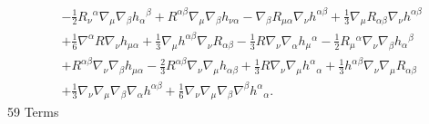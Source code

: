 \documentclass[10pt,letterpaper]{article}
\begin{document}
\begin{align}
& -  \tfrac{1}{2} R_{\nu}{}^{\alpha} \nabla_{\mu}\nabla_{\beta}h_{\alpha}{}^{\beta}
 + R^{\alpha \beta} \nabla_{\mu}\nabla_{\beta}h_{\nu \alpha}
 -  \nabla_{\beta}R_{\mu \alpha} \nabla_{\nu}h^{\alpha \beta}
 + \tfrac{1}{3} \nabla_{\mu}R_{\alpha \beta} \nabla_{\nu}h^{\alpha \beta}\nonumber\\
& + \tfrac{1}{6} \nabla^{\alpha}R \nabla_{\nu}h_{\mu \alpha}
 + \tfrac{1}{3} \nabla_{\mu}h^{\alpha \beta} \nabla_{\nu}R_{\alpha \beta}
 -  \tfrac{1}{3} R \nabla_{\nu}\nabla_{\alpha}h_{\mu}{}^{\alpha}
 -  \tfrac{1}{2} R_{\mu}{}^{\alpha} \nabla_{\nu}\nabla_{\beta}h_{\alpha}{}^{\beta}\nonumber\\
& + R^{\alpha \beta} \nabla_{\nu}\nabla_{\beta}h_{\mu \alpha}
 -  \tfrac{2}{3} R^{\alpha \beta} \nabla_{\nu}\nabla_{\mu}h_{\alpha \beta}
 + \tfrac{1}{3} R \nabla_{\nu}\nabla_{\mu}h^{\alpha}{}_{\alpha}
 + \tfrac{1}{3} h^{\alpha \beta} \nabla_{\nu}\nabla_{\mu}R_{\alpha \beta}\nonumber\\
& + \tfrac{1}{3} \nabla_{\nu}\nabla_{\mu}\nabla_{\beta}\nabla_{\alpha}h^{\alpha \beta}
 + \tfrac{1}{6} \nabla_{\nu}\nabla_{\mu}\nabla_{\beta}\nabla^{\beta}h^{\alpha}{}_{\alpha}.
\end{align}
59 Terms
\end{document}
